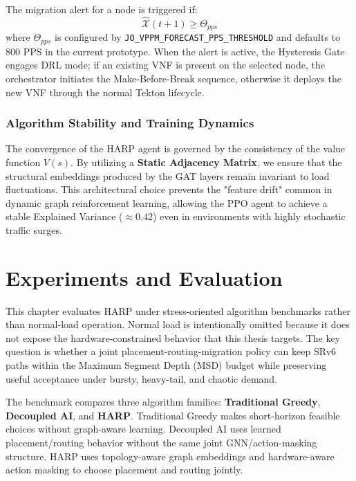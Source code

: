 \documentclass[12pt, a4paper, reqno, oneside]{book}
\begin{document}
The migration alert for a node is triggered if:
\begin{equation}
\hat{\mathcal{X}}(t+1) \ge \Theta_{pps}
\end{equation}
where $\Theta_{pps}$ is configured by \texttt{JO\_VPPM\_FORECAST\_PPS\_THRESHOLD} and defaults to 800 PPS in the current prototype. When the alert is active, the Hysteresis Gate engages DRL mode; if an existing VNF is present on the selected node, the orchestrator initiates the Make-Before-Break sequence, otherwise it deploys the new VNF through the normal Tekton lifecycle.

\subsection{Algorithm Stability and Training Dynamics}
The convergence of the HARP agent is governed by the consistency of the value function $V(s)$. By utilizing a \textbf{Static Adjacency Matrix}, we ensure that the structural embeddings produced by the GAT layers remain invariant to load fluctuations. This architectural choice prevents the "feature drift" common in dynamic graph reinforcement learning, allowing the PPO agent to achieve a stable Explained Variance ($\approx 0.42$) even in environments with highly stochastic traffic surges.




\chapter{Experiments and Evaluation}
\label{chap:experiments}

This chapter evaluates HARP under stress-oriented algorithm benchmarks rather than normal-load operation. Normal load is intentionally omitted because it does not expose the hardware-constrained behavior that this thesis targets. The key question is whether a joint placement-routing-migration policy can keep SRv6 paths within the Maximum Segment Depth (MSD) budget while preserving useful acceptance under bursty, heavy-tail, and chaotic demand.

The benchmark compares three algorithm families: \textbf{Traditional Greedy}, \textbf{Decoupled AI}, and \textbf{HARP}. Traditional Greedy makes short-horizon feasible choices without graph-aware learning. Decoupled AI uses learned placement/routing behavior without the same joint GNN/action-masking structure. HARP uses topology-aware graph embeddings and hardware-aware action masking to choose placement and routing jointly.
\end{document}
